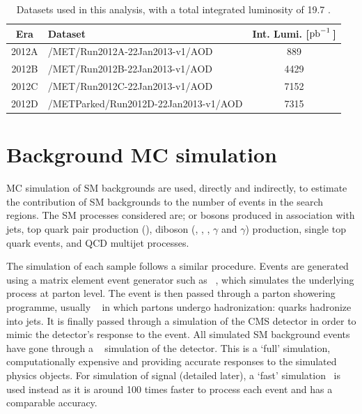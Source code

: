 \begin{table} %
    \begin{center}
    \caption{Datasets used in this analysis, with a total integrated luminosity of 19.7 \fbinv.}
     \begin{tabular}{clc}\hline
Era    &       Dataset  &  Int. Lumi. [$\mathrm{pb}^{-1}\,$]\\ \hline
2012A & /MET/Run2012A-22Jan2013-v1/AOD & 889 \\
2012B & /MET/Run2012B-22Jan2013-v1/AOD & 4429 \\
2012C & /MET/Run2012C-22Jan2013-v1/AOD & 7152 \\
2012D & /METParked/Run2012D-22Jan2013-v1/AOD & 7315 \\ \hline
                \end{tabular}
                    \label{tab:dataSets}
\end{center}
\end{table}




%
\section{Background MC simulation} 
\label{sec:GEN}
\ac{MC} simulation of \ac{SM} backgrounds are used, directly and indirectly, to estimate the contribution of \ac{SM} backgrounds to the number of events in the search regions. 
The \ac{SM} processes considered are;  \W or \Z bosons produced in association with jets, top quark pair production (\ttbar), diboson (\W\W, \W\Z, \Z\Z, \W$\gamma$ and \Z$\gamma$) production, single top quark events, and QCD multijet processes.

The simulation of each sample follows a similar procedure.
Events are generated using a matrix element event generator such as \MADGRAPH{}~\cite{madgraph,madgraph2}, which simulates the underlying process at parton level. 
The event is then passed through a parton showering programme, usually \PYTHIA{}~\cite{pythia,pythia8,pythia-z2} in which partons undergo hadronization: quarks hadronize into jets.
It is finally passed through a simulation of the CMS detector in order to mimic the detector's response to the event.
All simulated \ac{SM} background events have gone through a \GEANTfour~\cite{Geant4-1,Geant4-2} simulation of the detector. 
This is a `full' simulation, computationally expensive and providing accurate responses to the simulated physics objects.  
For simulation of signal (detailed later), a `fast' simulation~\cite{FASTSIM} is used instead as it is around 100 times faster to process each event and has a comparable accuracy.

